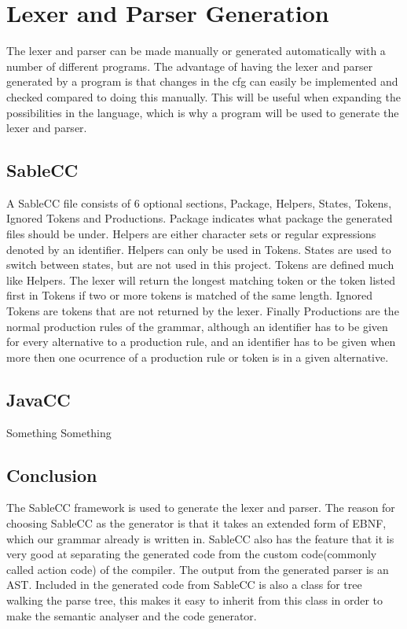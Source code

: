 \chapter{Lexer and Parser Generation}

The lexer and parser can be made manually or generated automatically with a number of different programs. The advantage of having the lexer and parser generated by a program is that changes in the cfg can easily be implemented and checked compared to doing this manually. This will be useful when expanding the possibilities in the language, which is why a program will be used to generate the lexer and parser.

\section{SableCC}
A SableCC file consists of 6 optional sections, Package, Helpers, States, Tokens, Ignored Tokens and Productions.
Package indicates what package the generated files should be under. Helpers are either character sets or regular expressions denoted by an identifier. Helpers can only be used in Tokens. States are used to switch between states, but are not used in this project. Tokens are defined much like Helpers. The lexer will return the longest matching token or the token listed first in Tokens if two or more tokens is matched of the same length. Ignored Tokens are tokens that are not returned by the lexer. Finally Productions are the normal production rules of the grammar, although an identifier has to be given for every alternative to a production rule, and an identifier has to be given when more then one ocurrence of a production rule or token is in a given alternative.

\section{JavaCC}
Something Something

\section{Conclusion}
The SableCC framework is used to generate the lexer and parser. The reason for choosing SableCC as the generator is that it takes an extended form of EBNF, which our grammar already is written in. SableCC also has the feature that it is very good at separating the generated code from the custom code(commonly called action code) of the compiler. The output from the generated parser is an AST. Included in the generated code from SableCC is also a class for tree walking the parse tree, this makes it easy to inherit  from this class in order to make the semantic analyser and the code generator.